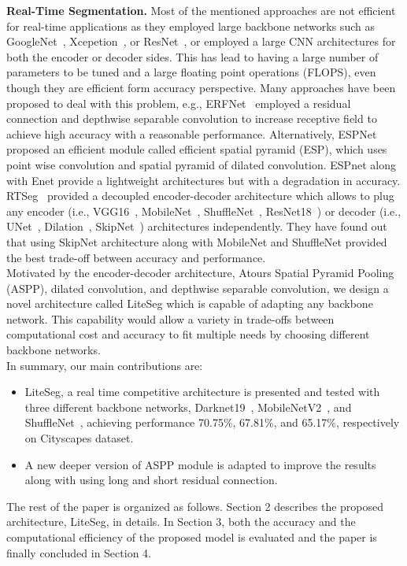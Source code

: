 \documentclass[conference,a4paper]{IEEEtran}
\begin{document}
\textbf{Real-Time Segmentation.} Most of the mentioned approaches are not efficient for real-time applications as they employed large backbone networks such as GoogleNet~\cite{szegedy2015going}, Xcepetion~\cite{simonyan2014very}, or ResNet~\cite{resnet}, or employed a large CNN architectures for both the encoder or decoder sides. This has lead to having a large number of parameters to be tuned and a large floating point operations (FLOPS), even though they are efficient form accuracy perspective.
Many approaches have been proposed to deal with this problem, e.g., ERFNet~\cite{erfnet} employed a residual connection and depthwise separable convolution to increase receptive field to achieve high accuracy with a reasonable performance. Alternatively, ESPNet~\cite{espnet} proposed an efficient module called efficient spatial pyramid (ESP), which uses point wise convolution and spatial pyramid of dilated convolution. ESPnet along with Enet provide a lightweight architectures but with a degradation in accuracy. RTSeg~\cite{rtseg} provided a decoupled encoder-decoder architecture which allows to plug any encoder (i.e., VGG16~\cite{simonyan2014very}, MobileNet~\cite{mobilenetv2}, ShuffleNet~\cite{shufflenet}, ResNet18~\cite{resnet}) or decoder (i.e., UNet~\cite{ronneberger2015u}, Dilation~\cite{yu2015multi}, SkipNet~\cite{long2015fully}) architectures independently. They have found out that using SkipNet architecture along with MobileNet and ShuffleNet provided the best trade-off between accuracy and performance.
\\Motivated by the encoder-decoder architecture, Atours Spatial Pyramid Pooling (ASPP), dilated convolution, and depthwise separable convolution, we design a novel architecture called LiteSeg which is capable of adapting any backbone network. This capability would allow a variety in trade-offs between computational cost and accuracy to fit multiple needs by choosing different backbone networks.
\\
In summary, our main contributions are:
\begin{itemize}
\item LiteSeg, a real time competitive architecture is presented and tested with three different backbone networks, Darknet19~\cite{yolo}, MobileNetV2~\cite{mobilenetv2}, and ShuffleNet~\cite{shufflenet}, achieving performance 70.75\%, 67.81\%, and 65.17\%, respectively on Cityscapes dataset.
\item A new deeper version of ASPP module is adapted to improve the results along with using long and short residual connection.
\end{itemize}
The rest of the paper is organized as follows. Section 2 describes the proposed architecture, LiteSeg, in details. In Section 3, both the accuracy and the computational efficiency of the proposed model is evaluated and the paper is finally concluded in Section 4.
\end{document}
